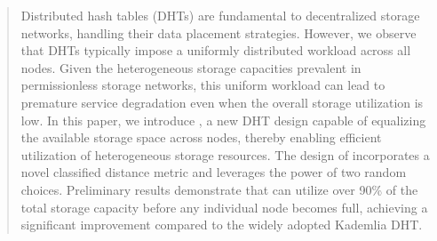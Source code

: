 \begin{abstract}

Distributed hash tables (DHTs) are fundamental to decentralized storage networks, handling their data placement strategies.
However, we observe that DHTs typically impose a uniformly distributed workload across all nodes.
Given the heterogeneous storage capacities prevalent in permissionless storage networks, this uniform workload can lead to premature service degradation even when the overall storage utilization is low.
In this paper, we introduce \dht, a new DHT design capable of equalizing the available storage space across nodes, thereby enabling efficient utilization of heterogeneous storage resources.
The design of \dht incorporates a novel classified distance metric and leverages the power of two random choices.
Preliminary results demonstrate that \dht can utilize over 90\% of the total storage capacity before any individual node becomes full, achieving a significant improvement compared to the widely adopted Kademlia DHT.

\end{abstract}